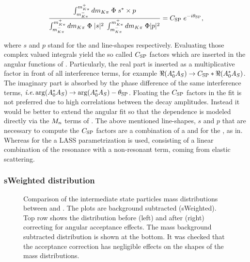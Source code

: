\begin{equation}
  \centering
  \label{csp_def}
  \frac{\int_{\mkpi^-}^{\mkpi^+} d\mkpi \; \Phi \; s^* \times p} {\int_{\mkpi^-}^{\mkpi^+} d\mkpi \; \Phi \; |s|^2 \; \int_{\mkpi^-}^{\mkpi^+} d\mkpi \; \Phi |p|^2} = \CSP \; e^{-i\ThetaSP},
\end{equation}

\noindent where $s$ and $p$ stand for the \swave and \pwave line-shapes respectively. Evaluating those complex valued integrals yield
the so called $C_{\text{SP}}$ factors which are inserted in the angular functions of . Particularly, the real part
is inserted as a multiplicative factor in front of all \spwave interference terms, for example $\Re({A}_{0}^* {A}_{S}) \rightarrow C_{\text{SP}} * \Re({A}_{0}^* {A}_{S})$.
The imaginary part is absorbed by the phase difference of the same interference
terms, $\mbox{\itshape i.e.} \arg(A_0^*A_S) \rightarrow \arg(A_0^*A_S) - \theta_{\text{SP}}$. Floating the $C_{\text{SP}}$ factors in the fit is not preferred due
to high correlations between the decay amplitudes. Instead it would be better to extend the angular fit so that the \mkpi dependence
is modeled directly via the $M_{n}$ terms of . The above mentioned line-shapes, $s$ and $p$ that are necessary
to compute the $C_{\text{SP}}$ factors are a combination of a \KstENT and \KstOFOZ for the \pwave, as in\cite{PhysRevD.11.3165}.
Whereas for the \swave a LASS parametrization\cite{Aston1988493} is used, consisting of a linear combination of the \KstOFTZ resonance with
a non-resonant term, coming from elastic scattering.

\subsubsection{sWeighted \mkpi distribution}

\begin{figure}[!t]
  \centering
  \begin{subfigure}{0.5\textwidth}
    \scalebox{0.56}{}
    \caption{}
    \label{mkpiPlot_raw}
  \end{subfigure}%
  \hfill%
  \begin{subfigure}{0.5\textwidth}
    \scalebox{0.56}{}
    \caption{}
    \label{mkpiPlot_eff}
  \end{subfigure}
  \begin{subfigure}{0.5\textwidth}
    \scalebox{0.56}{}
    \caption{}
    \label{jpsiPlot}
  \end{subfigure}
\caption{Comparison of the intermediate state particles mass distributions between \Bs and \Bd.
         The plots are background subtracted (sWeighted). Top row shows the \mkpi distribution before (left)
         and after (right) correcting for angular acceptance effects. The \jpsi mass background subtracted
         distribution is shown at the bottom. It was checked that the acceptance correction has negligible
         effects on the shapes of the \jpsi mass distributions.}
\end{figure}

